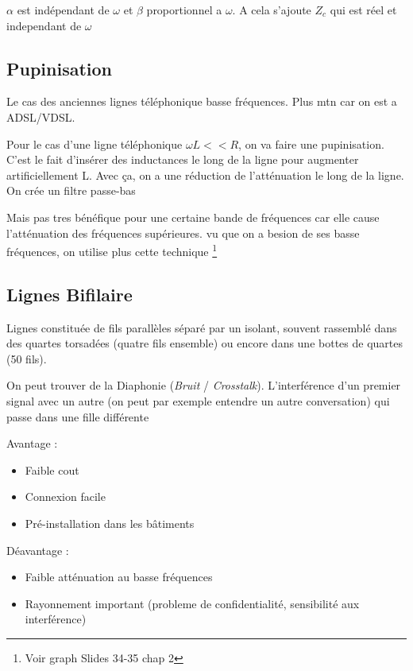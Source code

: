			$\alpha$ est indépendant de $\omega$ et $\beta$ proportionnel a $\omega$. A cela s'ajoute $Z_c$ qui est réel et independant de $\omega$
			
	\newpage
			
	\subsection{Pupinisation}
	
		Le cas des anciennes lignes téléphonique basse fréquences. Plus mtn car on est a ADSL/VDSL.
		
		Pour le cas d'une ligne téléphonique $\omega L << R$, on va faire une pupinisation. C'est le fait d'insérer des inductances le long de la ligne pour augmenter artificiellement L. Avec ça, on a une réduction de l'atténuation le long de la ligne. On crée un filtre passe-bas
		
		Mais pas tres bénéfique pour une certaine bande de fréquences car elle cause l'atténuation des fréquences supérieures. vu que on a besion de ses basse fréquences, on utilise plus cette technique \footnote{Voir graph Slides 34-35 chap 2}
		
	\subsection{Lignes Bifilaire}
	
		Lignes constituée de fils parallèles séparé par un isolant, souvent rassemblé dans des quartes torsadées (quatre fils ensemble) ou encore dans une bottes de quartes (50 fils).
		
		On peut trouver de la Diaphonie (\textit{Bruit} / \textit{Crosstalk}). L'interférence d'un premier signal avec un autre (on peut par exemple entendre un autre conversation) qui passe dans une fille différente
		
		Avantage :
		\begin{itemize}
			\item Faible cout
			\item Connexion facile
			\item Pré-installation dans les bâtiments
		\end{itemize}
		
		Déavantage :
		\begin{itemize}
			\item Faible atténuation au basse fréquences
			\item Rayonnement important (probleme de confidentialité, sensibilité aux interférence)

		\end{itemize}

